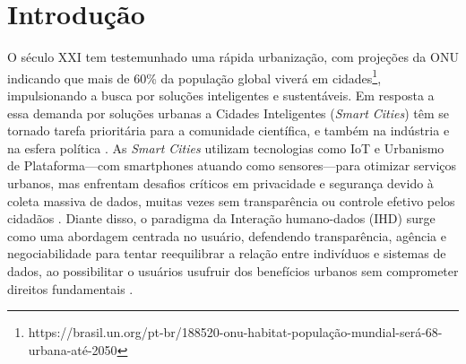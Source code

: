 \documentclass[
	12pt,				%
	oneside,			%
	a4paper,			%
	english,			%
	brazil				%
	]{abntex2ppgsi}
\begin{document}
%
% 

\tableofcontents*
\cleardoublepage



\textual



% 
%
%
\chapter{Introdução}

    O século XXI tem testemunhado uma rápida urbanização, com projeções da ONU indicando que mais de 60\% da população global viverá em cidades\footnote{https://brasil.un.org/pt-br/188520-onu-habitat-população-mundial-será-68-urbana-até-2050}, impulsionando a busca por soluções inteligentes e sustentáveis. Em resposta a essa demanda por soluções urbanas  a Cidades Inteligentes (\textit{Smart Cities})  têm se tornado tarefa prioritária para a comunidade científica, e também na indústria e na esfera política \cite{EREMIA201712}. As \textit{Smart Cities} utilizam tecnologias como IoT e Urbanismo de Plataforma—com smartphones atuando como sensores—para otimizar serviços urbanos, mas enfrentam desafios críticos em privacidade e segurança devido à coleta massiva de dados, muitas vezes sem transparência ou controle efetivo pelos cidadãos \cite{streitz2019beyond}. Diante disso, o paradigma da Interação humano-dados (IHD) surge como uma abordagem centrada no usuário, defendendo transparência, agência e negociabilidade para tentar reequilibrar a relação entre indivíduos e sistemas de dados, ao possibilitar o usuários usufruir dos benefícios urbanos sem comprometer direitos fundamentais \cite{mortier2015humandatainteractionhumanface}.
\end{document}
